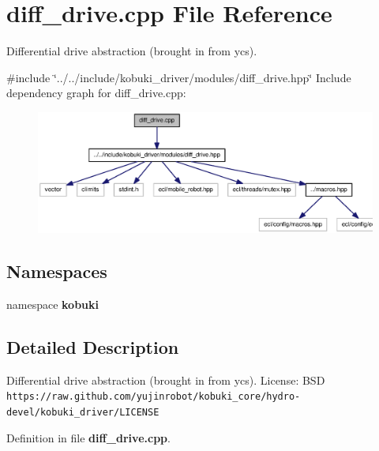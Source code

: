 \section{diff\-\_\-drive.\-cpp \-File \-Reference}
\label{diff__drive_8cpp}


\-Differential drive abstraction (brought in from ycs).  


{\ttfamily \#include \char`\"{}../../include/kobuki\-\_\-driver/modules/diff\-\_\-drive.\-hpp\char`\"{}}\*
\-Include dependency graph for diff\-\_\-drive.\-cpp\-:
\nopagebreak
\begin{figure}[H]
\begin{center}
\leavevmode
\includegraphics[width=350pt]{diff__drive_8cpp__incl}
\end{center}
\end{figure}
\subsection*{\-Namespaces}
\begin{DoxyCompactItemize}
\item 
namespace {\bf kobuki}
\end{DoxyCompactItemize}


\subsection{\-Detailed \-Description}
\-Differential drive abstraction (brought in from ycs). \-License\-: \-B\-S\-D {\tt https\-://raw.\-github.\-com/yujinrobot/kobuki\-\_\-core/hydro-\/devel/kobuki\-\_\-driver/\-L\-I\-C\-E\-N\-S\-E} 

\-Definition in file {\bf diff\-\_\-drive.\-cpp}.

